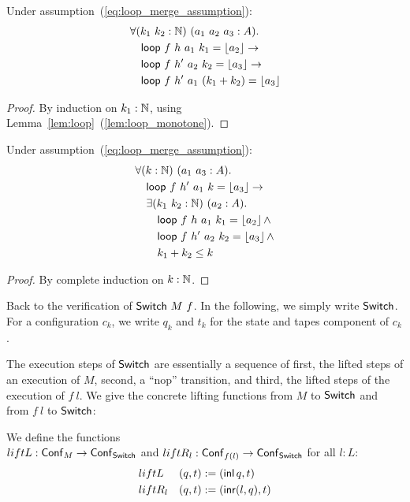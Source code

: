 \begin{lemma}
  \label{lem:loop_merge}
  Under assumption~(\ref{eq:loop_merge_assumption}):
  \begin{align*}
    & \forall (k_1~k_2:\mathbb{N})~(a_1~a_2~a_3 : A).\\
    & \quad \mathsf{loop}~f~h ~a_1~k_1       = \left\lfloor {a_2} \right\rfloor \rightarrow\\
    & \quad \mathsf{loop}~f~h'~a_2~k_2       = \left\lfloor {a_3} \right\rfloor \rightarrow\\
    & \quad \mathsf{loop}~f~h'~a_1~(k_1+k_2) = \left\lfloor {a_3} \right\rfloor
  \end{align*}
\end{lemma}
\begin{proof}
  By induction on $k_1:\mathbb{N}$, using Lemma~\ref{lem:loop}~(\ref{lem:loop_monotone}).
\end{proof}
\begin{lemma}
  \label{lem:loop_split}
  Under assumption~(\ref{eq:loop_merge_assumption}):
  \begin{align*}
    & \forall (k:\mathbb{N})~(a_1~a_3 : A).\\
    & \quad \mathsf{loop}~f~h'~a_1~k = \left\lfloor {a_3} \right\rfloor \rightarrow \\
    & \quad \exists (k_1~k_2:\mathbb{N})~(a_2:A).\\
    & \quad \quad \mathsf{loop}~f~h ~a_1~k_1 = \left\lfloor {a_2} \right\rfloor \land\\
    & \quad \quad \mathsf{loop}~f~h'~a_2~k_2 = \left\lfloor {a_3} \right\rfloor \land\\
    & \quad \quad k_1 + k_2 \leq k
  \end{align*}
\end{lemma}
\begin{proof}
  By complete induction on $k:\mathbb{N}$.
\end{proof}


Back to the verification of $\mathsf{Switch}~M~f$.  In the following, we simply write $\mathsf{Switch}$.  For a configuration $c_k$, we write $q_k$ and $t_k$ for the
state and tapes component of $c_k$.

The execution steps of $\mathsf{Switch}$ are essentially a sequence of first, the lifted steps of an execution of $M$, second, a ``nop'' transition, and
third, the lifted steps of the execution of $f~l$.  We give the concrete lifting functions from $M$ to $\mathsf{Switch}$ and from $f~l$ to $\mathsf{Switch}$:
%
\begin{definition}
  We define the functions \\$liftL : \mathsf{Conf}_M \rightarrow \mathsf{Conf}_{\mathsf{Switch}}$ and $liftR_l : \mathsf{Conf}_{f(l)} \rightarrow \mathsf{Conf}_{\mathsf{Switch}}$ for all $l:L$:
  \begin{alignat*}{2}
    & liftL   & (q, t) &:= (\operatorname{\mathsf{inl}} q,      t) \\
    & liftR_l & (q, t) &:= (\operatorname{\mathsf{inr}} (l, q), t)
  \end{alignat*}
\end{definition}

